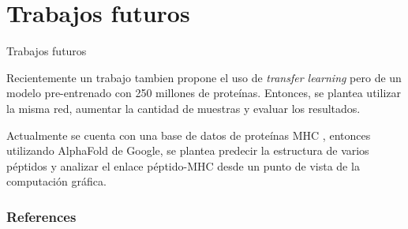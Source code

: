 \documentclass[10pt]{beamer}
\newcommand{\1}{
	\setbeamertemplate{background}{
		\texttt{[image: img/1]}
		\tikz[overlay] \fill[fill opacity=0.75,fill=white] (0,0) rectangle (-\paperwidth,\paperheight);
	}
}
\begin{document}
\section{Trabajos futuros}


\begin{frame}{Trabajos futuros}{}
	\begin{block}{}
		Recientemente un trabajo \cite{hashemi2022improved} tambien propone el uso de \textit{transfer learning} pero de un modelo pre-entrenado con 250 millones de proteínas. Entonces, se plantea utilizar la misma red, aumentar la cantidad de muestras y evaluar los resultados.
	\end{block}
	
	\begin{block}{}
		Actualmente se cuenta con una base de datos de proteínas MHC \cite{e2019phla3d}, entonces utilizando AlphaFold de Google, se plantea predecir la estructura de varios péptidos y analizar el enlace péptido-MHC desde un punto de vista de la computación gráfica.	
	\end{block}
	
	
\end{frame}

\begin{frame}[allowframebreaks]
	\frametitle{References}
	
	
\end{frame}
\end{document}
